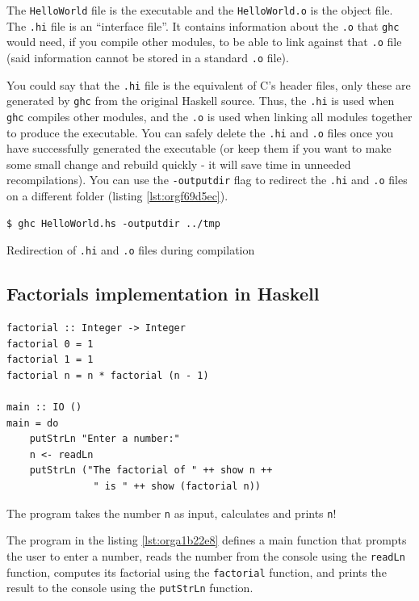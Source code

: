 \documentclass[a4paper, titlepage, twoside]{article}
\begin{document}
The \texttt{HelloWorld} file is the executable and the \texttt{HelloWorld.o} is the object file. The \texttt{.hi} file is an ``interface file''. It contains information about the \texttt{.o} that \texttt{ghc} would need, if you compile other modules, to be able to link against that \texttt{.o} file (said information cannot be stored in a standard \texttt{.o} file).

You could say that the \texttt{.hi} file is the equivalent of C's header files, only these are generated by \texttt{ghc} from the original Haskell source. Thus, the \texttt{.hi} is used when \texttt{ghc} compiles other modules, and the \texttt{.o} is used when linking all modules together to produce the executable. You can safely delete the \texttt{.hi} and \texttt{.o} files once you have successfully generated the executable (or keep them if you want to make some small change and rebuild quickly - it will save time in unneeded recompilations). You can use the \texttt{-outputdir} flag to redirect the \texttt{.hi} and \texttt{.o} files on a different folder (listing \ref{lst:orgf69d5ec}).

\begin{listing}[htbp]
\begin{verbatim}
$ ghc HelloWorld.hs -outputdir ../tmp
\end{verbatim}
\caption{\label{lst:orgf69d5ec}Redirection of \texttt{.hi} and \texttt{.o} files during compilation}
\end{listing}

\subsection{Factorials implementation in Haskell}
\label{sec:org4b3b607}

\begin{listing}[htbp]
\begin{verbatim}
factorial :: Integer -> Integer
factorial 0 = 1
factorial 1 = 1
factorial n = n * factorial (n - 1)

main :: IO ()
main = do
    putStrLn "Enter a number:"
    n <- readLn
    putStrLn ("The factorial of " ++ show n ++
               " is " ++ show (factorial n))
\end{verbatim}
\caption{\label{lst:orga1b22e8}The program takes the number \texttt{n} as input, calculates and prints \texttt{n}!}
\end{listing}

The program in the listing \ref{lst:orga1b22e8} defines a main function that prompts the user to enter a number, reads the number from the console using the \texttt{readLn} function, computes its factorial using the \texttt{factorial} function, and prints the result to the console using the \texttt{putStrLn} function.
\end{document}
